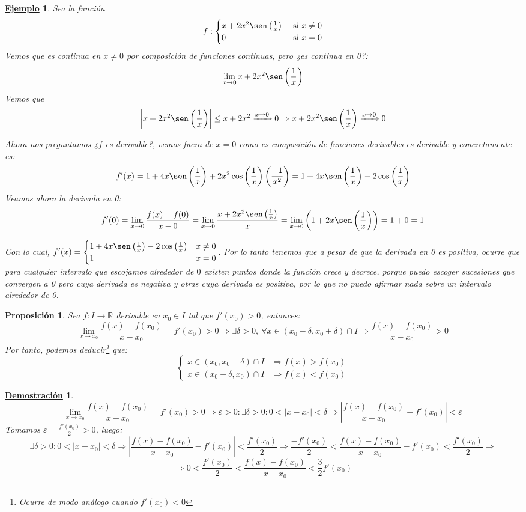 \documentclass[10pt,a4paper,openright]{book}
\theoremstyle{break}
\newtheorem{prop}{Proposición}[chapter]
\newtheorem*{demo}{\underline{Demostración}}
\newtheorem{ej}{\underline{Ejemplo}}[chapter]
\begin{document}
\begin{ej}
Sea la función
$$f:\begin{cases}x+2x^2 \sen\left(\frac{1}{x}\right) & \mbox{ si }x\neq 0\\ 0 &\mbox{ si }x=0 \end{cases}$$
Vemos que es continua en $x\neq 0$ por composición de funciones continuas, pero ¿es continua en 0?:
$$\lim_{x\rightarrow 0} x+2x^2 \sen\left(\frac{1}{x}\right)$$
Vemos que
$$\left|x+2x^2 \sen\left(\frac{1}{x}\right)\right|\leq x+2x^2\xrightarrow{x\rightarrow 0} 0\Rightarrow x+2x^2 \sen\left(\frac{1}{x}\right)\xrightarrow{x\rightarrow 0}0$$ 

Ahora nos preguntamos ¿$f$ es derivable?, vemos fuera de $x=0$ como es composición de funciones derivables es derivable y concretamente es:
$$f'(x)=1+4x\sen\left(\frac{1}{x}\right)+2x^2\cos\left(\frac{1}{x}\right)\left(\frac{-1}{x^2}\right)=1+4x\sen\left(\frac{1}{x}\right)-2\cos\left(\frac{1}{x}\right)$$
Veamos ahora la derivada en 0:
$$f'(0)=\lim_{x\rightarrow 0}\frac{f(x)-f(0)}{x-0}=\lim_{x\rightarrow 0}\frac{x+2x^2\sen\left(\frac{1}{x}\right)}{x}=\lim_{x\rightarrow 0 }\left(1+2x\sen\left(\frac{1}{x}\right)\right)=1+0=1$$

Con lo cual, $f'(x)=\begin{cases}1+4x\sen\left(\frac{1}{x}\right)-2\cos\left(\frac{1}{x}\right) & x\neq 0\\ 1 & x=0\end{cases}$. Por lo tanto tenemos que a pesar de que la derivada en 0 es positiva, ocurre que para cualquier intervalo que escojamos alrededor de $0$ existen puntos donde la función crece y decrece, porque puedo escoger sucesiones que convergen a 0 pero cuya derivada es negativa y otras cuya derivada es positiva, por lo que no puedo afirmar nada sobre un intervalo alrededor de 0.
\end{ej}

\begin{prop}
Sea $f:I\rightarrow\mathbb R$ derivable en $x_0\in I$ tal que $f'(x_0)>0$, entonces:
$$\lim_{x\rightarrow x_0}\frac{f(x)-f(x_0)}{x-x_0}=f'(x_0)>0\Rightarrow \exists \delta>0, \ \forall x\in (x_0-\delta, x_0+\delta)\cap I\Rightarrow \frac{f(x)-f(x_0)}{x-x_0}>0$$
Por tanto, podemos deducir\footnote{Ocurre de modo análogo cuando $f'(x_0)<0$} que:
$$\begin{cases} x\in (x_0,x_0+\delta)\cap I &\Rightarrow f(x)>f(x_0)\\
x\in (x_0-\delta,x_0)\cap I & \Rightarrow f(x)<f(x_0)\end{cases}$$
\end{prop}
\begin{demo}
$$\lim_{x\rightarrow x_0}\frac{f(x)-f(x_0)}{x-x_0}=f'(x_0)>0\Rightarrow \varepsilon>0: \exists \delta>0 : 0<|x-x_0|<\delta\Rightarrow \left|\frac{f(x)-f(x_0)}{x-x_0} - f'(x_0)\right|<\varepsilon$$
Tomamos $\varepsilon = \frac{f'(x_0)}{2}>0$, luego:
$$\exists \delta>0 : 0<|x-x_0|<\delta\Rightarrow \left|\frac{f(x)-f(x_0)}{x-x_0} - f'(x_0)\right|<\frac{f'(x_0)}{2}\Rightarrow \frac{-f'(x_0)}{2}< \frac{f(x)-f(x_0)}{x-x_0} - f'(x_0)< \frac{f'(x_0)}{2}\Rightarrow $$
$$\Rightarrow 0< \frac{f'(x_0)}{2} <\frac{f(x)-f(x_0)}{x-x_0}<\frac{3}{2}f'(x_0)$$
\end{demo}
\end{document}
